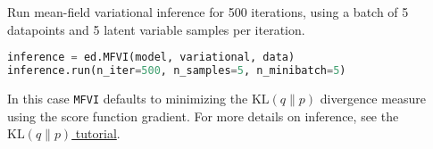 Run mean-field variational inference for 500 iterations, using a batch
of 5 datapoints and 5 latent variable samples per iteration.
\begin{lstlisting}[language=Python]
inference = ed.MFVI(model, variational, data)
inference.run(n_iter=500, n_samples=5, n_minibatch=5)
\end{lstlisting}
In this case
\texttt{MFVI} defaults to minimizing the
$\text{KL}(q\|p)$ divergence measure using the score function
gradient.
For more details on inference, see the \href{tut_KLqp}{$\text{KL}(q\|p)$ tutorial}.


